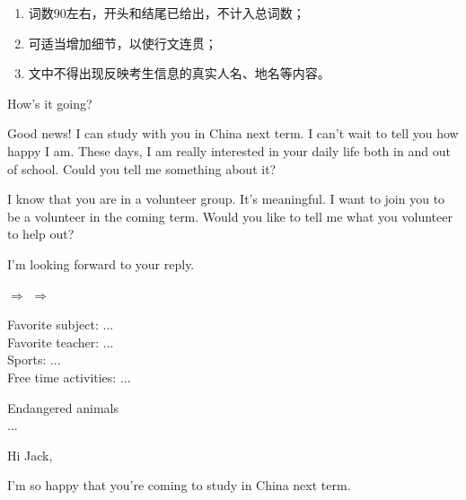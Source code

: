 \documentclass{ExamJHSEngl}
\begin{document}
\begin{enumerate}[1.]
  \item 词数90左右，开头和结尾已给出，不计入总词数；
  \item 可适当增加细节，以使行文连贯；
  \item 文中不得出现反映考生信息的真实人名、地名等内容。
\end{enumerate}

\begin{minipage}[]{0.6\linewidth}\setlength{\parindent}{1.5em}
    \begin{framed}
How's it going?\par
Good news! I can study with you in China next term. I can't wait to tell you how happy I am. These days, I am really interested in your daily life both in and out of school. Could you tell me something about it?\par
I know that you are in a volunteer group. It's meaningful. I want to join you to be a volunteer in the coming term. Would you like to tell me what you volunteer to help out?\par
I'm looking forward to your reply.\par
{}
    \end{framed}
\end{minipage}
\begin{minipage}[]{0.05\linewidth}
    $\Rightarrow$
    $\Rightarrow$
\end{minipage}
\begin{minipage}[]{0.3\linewidth}
    \begin{framed}
Favorite subject: ...\\
Favorite teacher: ...\\
Sports: ...\\
Free time activities: ...
    \end{framed}
    \begin{framed}
Endangered animals\\
...
    \end{framed}
\end{minipage}

Hi Jack, 

\ifshowAnswer

I'm so happy that you're coming to study in China next term. 

\end{document}
